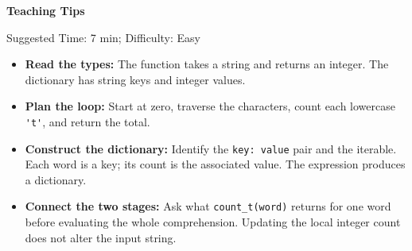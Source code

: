 \begin{questionmeta}
\textbf{Teaching Tips}\par\nopagebreak[4]
Suggested Time: 7 min; Difficulty: Easy
\nopagebreak[4]
\begin{itemize}
    \item \textbf{Read the types:} The function takes a string and returns
    an integer. The dictionary has string keys and integer values.
    \item \textbf{Plan the loop:} Start at zero, traverse the characters,
    count each lowercase \lstinline{'t'}, and return the total.
    \item \textbf{Construct the dictionary:} Identify the
    \lstinline{key: value} pair and the iterable. Each word is a key;
    its count is the associated value. The expression produces a dictionary.
    \item \textbf{Connect the two stages:} Ask what \lstinline{count_t(word)}
    returns for one word before evaluating the whole comprehension.
    Updating the local integer count does not alter the input string.
\end{itemize}
\end{questionmeta}

